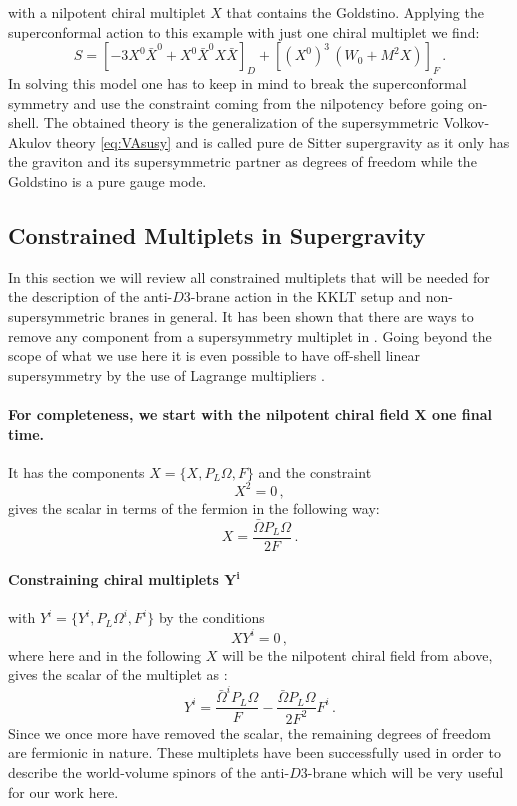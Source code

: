 \documentclass[a4paper,12pt,twoside,openright]{report}
\newcommand{\be}{\begin{equation}}
\newcommand{\ee}{\end{equation}}
\begin{document}
with a nilpotent chiral multiplet $X$ that contains the Goldstino. Applying the superconformal action to this example with just one chiral multiplet we find:
\be 
S = \left[-3 X^0 \bar{X}^0 + X^0 \bar{X}^0 X\bar{X}\right]_D + \left[ (X^0)^3\, (W_0 + M^2 X) \right]_F\,.
\ee
In solving this model one has to keep in mind to break the superconformal symmetry and use the constraint coming from the nilpotency before going on-shell. The obtained theory is the generalization of the supersymmetric Volkov-Akulov theory \eqref{eq:VAsusy} and is called pure de Sitter supergravity \cite{Farakos:2013ih,Dudas:2015eha,Bergshoeff:2015tra,Hasegawa:2015bza,Ferrara:2015gta} as it only has the graviton and its supersymmetric partner as degrees of freedom while the Goldstino is a pure gauge mode.
\subsection{Constrained Multiplets in Supergravity}
\label{sec:constmult}
In this section we will review all constrained multiplets that will be needed for the description of the anti-$D3$-brane action in the KKLT setup and non-supersymmetric branes in general. It has been shown that there are ways to remove any component from a supersymmetry multiplet in \cite{DallAgata:2016syy}. Going beyond the scope of what we use here it is even possible to have off-shell linear supersymmetry by the use of Lagrange multipliers \cite{Ferrara:2016een}. 
\paragraph{For completeness, we start with the nilpotent chiral field $\mathbf{X}$ one final time.} It has the components $X = \{X,P_L \Omega, F\}$ and the constraint
\be 
X^2 = 0\,,
\ee
gives the scalar in terms of the fermion in the following way:
\be 
X = \frac{\bar{\Omega}P_L \Omega}{2F}\,.
\label{eq:nilconst}
\ee
\paragraph{Constraining chiral multiplets $\mathbf{Y^i}$} with $Y^i = \{Y^i, P_L \Omega^i,F^i\}$ by the conditions
\be 
X Y^i =0\,,
\ee
where here and in the following $X$ will be the nilpotent chiral field from above, gives the scalar of the multiplet as \cite{Brignole:1997pe,DallAgata:2015pdd}:
\be 
Y^i=\frac{\bar{\Omega}^i P_L\Omega}{F}-\frac{\bar{\Omega}P_L \Omega}{2F^2}F^i\,.
\ee
Since we once more have removed the scalar, the remaining degrees of freedom are fermionic in nature. These multiplets have been successfully used in order to describe the world-volume spinors of the anti-$D3$-brane \cite{Vercnocke:2016fbt,Kallosh:2016aep} which will be very useful for our work here.
\end{document}
